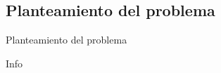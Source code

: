 %
%
%

\subsection{Planteamiento del problema}

\begin{frame}{Planteamiento del problema}
  
  Info


\end{frame}
